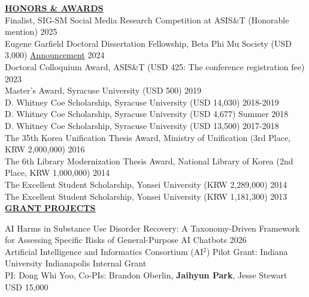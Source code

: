 \documentclass{article}
\begin{document}

\noindent \textbf{\underline{HONORS \& AWARDS}} \\
\noindent Finalist, SIG-SM Social Media Research Competition at ASIS\&T (Honorable mention) \hfill 2025 \\ 
\noindent Eugene Garfield Doctoral Dissertation Fellowship, Beta Phi Mu Society (USD 3,000) \hfill \href{https://www.betaphimu.org/news/2024-eugene-garfield-doctoral-dissertation-fellowship-awards}{Announcement} 2024 \\
\noindent Doctoral Colloquium Award, ASIS\&T (USD 425: The conference registration fee) \hfill 2023 \\
\noindent Master's Award, Syracuse University (USD 500) \hfill 2019 \\
\noindent D. Whitney Coe Scholarship, Syracuse University (USD 14,030) \hfill 2018-2019 \\
\noindent D. Whitney Coe Scholarship, Syracuse University (USD 4,677) \hfill Summer 2018 \\
\noindent D. Whitney Coe Scholarship, Syracuse University (USD 13,500) \hfill 2017-2018 \\
\noindent The 35th Korea Unification Thesis Award, Ministry of Unification (3rd Place, KRW 2,000,000) \hfill 2016 \\
\noindent The 6th Library Modernization Thesis Award, National Library of Korea (2nd Place, KRW 1,000,000) \hfill 2014 \\
\noindent The Excellent Student Scholarship, Yonsei University (KRW 2,289,000)
\hfill 2014 \\
\noindent The Excellent Student Scholarship, Yonsei University (KRW 1,181,300) \hfill 2013 \\

\noindent \textbf{\underline{GRANT PROJECTS}} 

\noindent AI Harms in Substance Use Disorder Recovery: A Taxonomy-Driven Framework for Assessing Specific Risks of General-Purpose AI Chatbots \hfill 2026 \\
\null \hfill Artificial Intelligence and Informatics Consortium (AI$^2$) Pilot Grant: Indiana University Indianapolis Internal Grant \\
PI: Dong Whi Yoo, Co-PIs: Brandon Oberlin, \textbf{Jaihyun Park}, Jesse Stewart 
\null \hfill USD 15,000 \\
\end{document}
